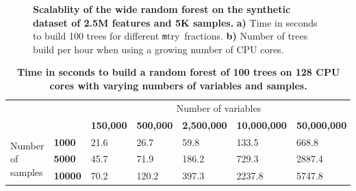 \documentclass[10pt,letterpaper]{article}
\newcommand{\mtry}{{\texttt mtry}}
\begin{document}
\begin{figure}[tbhp]
\begin{adjustwidth}{-1.00in}{0in}
\begin{tabular}{ll}
\end{tabular}
\caption{{\bf Scalablity of the wide random forest on the synthetic dataset of 2.5M features and 5K samples.} 
  {\bf a)} Time in seconds to build 100 trees for different \mtry\ fractions. 
  {\bf b)} Number of trees build per hour when using a growing number of CPU cores.}
\label{figure:synth}
\end{adjustwidth}
\end{figure}



\begin{table}[!ht]
\begin{adjustwidth}{-1.00in}{0in}
\centering
\caption{
{\bf Time in seconds to build a random forest of 100
  trees on 128 CPU cores with varying numbers of variables and samples.}}
\begin{tabular}{|l|l|l|l|l|l|l|}
\hline
\multicolumn{2}{|l|}{\multirow{2}{*}{}}           & \multicolumn{5}{c|}{Number of variables} \\
\cline{3-7}
\multicolumn{2}{|l|}{}                               & \bf{150,000} & \bf{500,000} & \bf{2,500,000}  & \bf{10,000,000} & \bf{50,000,000} \\
\hline                                                            
\multirow{4}{*}{Number of samples}      & \bf{1000}  & 21.6  & 26.7  & 59.8  & 133.5  & 668.8 \\
                                        & \bf{5000}  & 45.7  & 71.9  & 186.2 & 729.3  & 2887.4 \\
                                        & \bf{10000} & 70.2  & 120.2 & 397.3 & 2237.8 & 5747.8 \\
\hline
\end{tabular}
\begin{flushleft} 
\end{flushleft}
\label{table10}
\end{adjustwidth}
\end{table}
\end{document}
